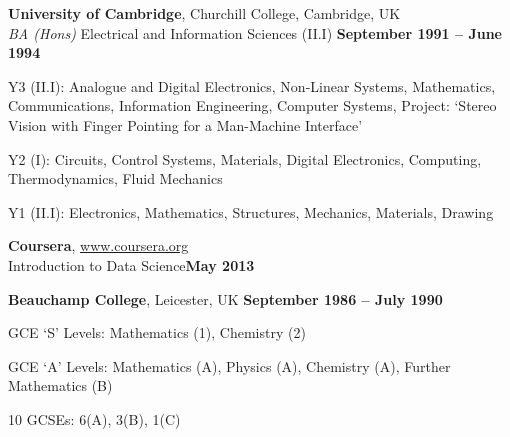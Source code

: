 \documentclass[margin = 0cm,line]{resume}
\begin{document}
\begin{resume}
    \textbf{University of Cambridge}, Churchill College, Cambridge, UK \vspace{2mm}\\\vspace{1mm}%
    \textsl{BA (Hons)} Electrical and Information Sciences (II.I)\hfill \textbf{ September 1991 -- June 1994}\vspace{-3mm}\\\vspace{-1mm}%
    \begin{list2}
        \item Y3 (II.I): Analogue and Digital Electronics, Non-Linear Systems, 
            Mathematics, Communications, Information Engineering, Computer 
            Systems, Project: `Stereo Vision with Finger Pointing for a Man-Machine Interface'
        \item Y2 (I): Circuits, Control Systems, Materials, Digital Electronics, 
            Computing, Thermodynamics, Fluid Mechanics
        \item Y1 (II.I): Electronics, Mathematics, Structures, Mechanics, Materials,  Drawing
    \end{list2}\vspace{-1.5mm}

    \textbf{Coursera}, \url{www.coursera.org} \vspace{2mm}\\\vspace{1mm}%
    Introduction to Data Science\hfill \textbf{May 2013}\vspace{-3mm}\\\vspace{-1mm}%

    \textbf{Beauchamp College}, Leicester, UK\hfill \textbf{ September 1986 -- July 1990}\vspace{-3mm}\\\vspace{-1mm}%
    \begin{list2}
        \item GCE `S' Levels: Mathematics (1), Chemistry (2)
        \item GCE `A' Levels: Mathematics (A), Physics (A), Chemistry (A), Further Mathematics (B)
        \item 10 GCSEs: 6(A), 3(B), 1(C)
    \end{list2}\vspace{-1.5mm}
 


\end{resume}
\end{document}
